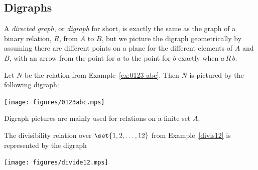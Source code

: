 \subsection{Digraphs} 

A \emph{directed graph}, or \emph{digraph} for short, is exactly the same
as the graph of a binary relation, $R$, from $A$ to $B$, but we picture
the digraph geometrically by assuming there are different points on a
plane for the different elements of $A$ and $B$, with an arrow from the
point for $a$ to the point for $b$ exactly when $a\, R\, b$.

\begin{example}
Let $N$ be the relation from Example~\ref{ex:0123-abc}.  Then $N$ is
pictured by the following digraph:
\begin{center}\texttt{[image: figures/0123abc.mps]}\end{center}
\end{example}

Digraph pictures are mainly used for relations on a finite set $A$.

\begin{example}
\begin{samepage}
The divisibility relation over $\set{1,2,\dots,12}$ from
Example~\ref{divis12} is represented by the digraph
\begin{center}
\texttt{[image: figures/divide12.mps]}
\end{center}
\end{samepage}
\end{example}
\iffalse

